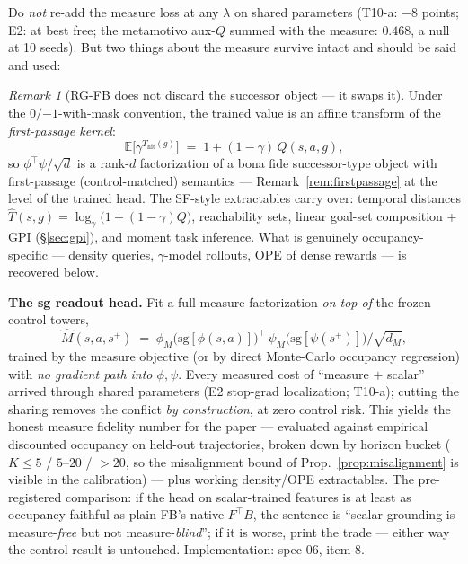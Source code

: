 \documentclass[11pt]{article}
\newcommand{\E}{\mathbb{E}}
\newcommand{\sg}{\mathrm{sg}}
\theoremstyle{definition}
\theoremstyle{remark}
\newtheorem{remark}{Remark}
\begin{document}
Do \emph{not} re-add the measure loss at any $\lambda$ on shared parameters (T10-a: $-8$
points; E2: at best free; the metamotivo aux-$Q$ summed with the measure: $0.468$, a null at
10 seeds). But two things about the measure survive intact and should be said and used:

\begin{remark}[RG-FB does not discard the successor object --- it swaps it]
\label{rem:fpkernel}
Under the $0/{-1}$-with-mask convention, the trained value is an affine transform of the
\emph{first-passage kernel}:
\begin{equation}
\E\big[\gamma^{T_{\mathrm{hit}}(g)}\big]\;=\;1+(1-\gamma)\,Q(s,a,g),
\label{eq:fpidentity}
\end{equation}
so $\phi^\top\psi/\sqrt d$ is a rank-$d$ factorization of a bona fide successor-type object
with first-passage (control-matched) semantics --- Remark~\ref{rem:firstpassage} at the level
of the trained head. The SF-style extractables carry over: temporal distances
$\hat T(s,g)=\log_\gamma\!\big(1+(1-\gamma)Q\big)$, reachability sets, linear goal-set
composition + GPI (\S\ref{sec:gpi}), and moment task inference. What is genuinely
occupancy-specific --- density queries, $\gamma$-model rollouts, OPE of dense rewards ---
is recovered below.
\end{remark}

\textbf{The sg readout head.} Fit a full measure factorization \emph{on top of} the frozen
control towers,
\begin{equation}
\widehat M(s,a,s^+)\;=\;\phi_M\big(\sg[\phi(s,a)]\big)^{\top}\,
\psi_M\big(\sg[\psi(s^+)]\big)/\sqrt{d_M},
\label{eq:sghead}
\end{equation}
trained by the measure objective (or by direct Monte-Carlo occupancy regression) with
\emph{no gradient path into $\phi,\psi$}. Every measured cost of ``measure $+$ scalar''
arrived through shared parameters (E2 stop-grad localization; T10-a); cutting the sharing
removes the conflict \emph{by construction}, at zero control risk. This yields the honest
measure fidelity number for the paper --- evaluated against empirical discounted occupancy
on held-out trajectories, broken down by horizon bucket ($K{\le}5$ / $5$--$20$ / ${>}20$, so
the misalignment bound of Prop.~\ref{prop:misalignment} is visible in the calibration) ---
plus working density/OPE extractables. The pre-registered comparison: if the head on
scalar-trained features is at least as occupancy-faithful as plain FB's native $F^\top B$,
the sentence is ``scalar grounding is measure-\emph{free} but not measure-\emph{blind}'';
if it is worse, print the trade --- either way the control result is untouched.
Implementation: spec 06, item 8.
\end{document}
